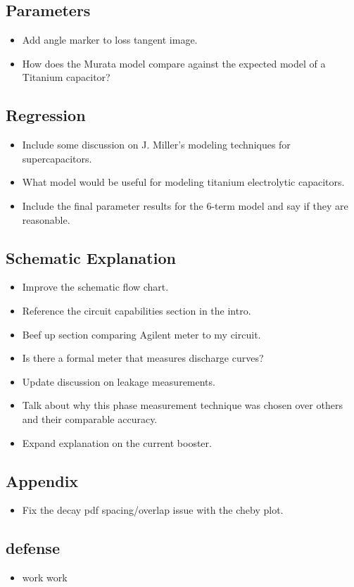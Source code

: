 \documentclass{article}
\begin{document}
\subsection{Parameters}
\begin{itemize}
    \item Add angle marker to loss tangent image.
    \item How does the Murata model compare against the expected model of a Titanium capacitor?
\end{itemize}

\subsection{Regression}
\begin{itemize}
    \item Include some discussion on J. Miller's modeling techniques for supercapacitors.
    \item What model would be useful for modeling titanium electrolytic capacitors.
    \item Include the final parameter results for the 6-term model and say if they are reasonable.
\end{itemize}

\subsection{Schematic Explanation}
\begin{itemize}
    \item Improve the schematic flow chart.
    \item Reference the circuit capabilities section in the intro.
    \item Beef up section comparing Agilent meter to my circuit.
    \item Is there a formal meter that measures discharge curves?
    \item Update discussion on leakage measurements.
    \item Talk about why this phase measurement technique was chosen over others and their comparable accuracy.
    \item Expand explanation on the current booster.
\end{itemize}

\subsection{Appendix}
\begin{itemize}
    \item Fix the decay pdf spacing/overlap issue with the cheby plot.
\end{itemize}

\subsection{defense}
\begin{itemize}
    \item work work
\end{itemize}


\end{document}
